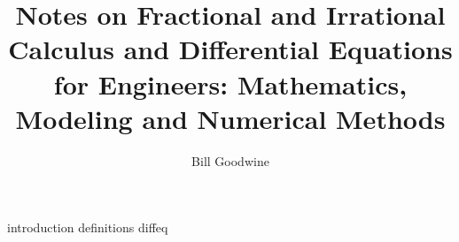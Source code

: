 \documentclass{book}
\title{Notes on Fractional and Irrational Calculus and Differential Equations for Engineers: Mathematics, Modeling and Numerical Methods}
\author{Bill Goodwine}
\begin{document}
\maketitle
\tableofcontents

{introduction}
{definitions}
{diffeq}

\backmatter


\end{document}
